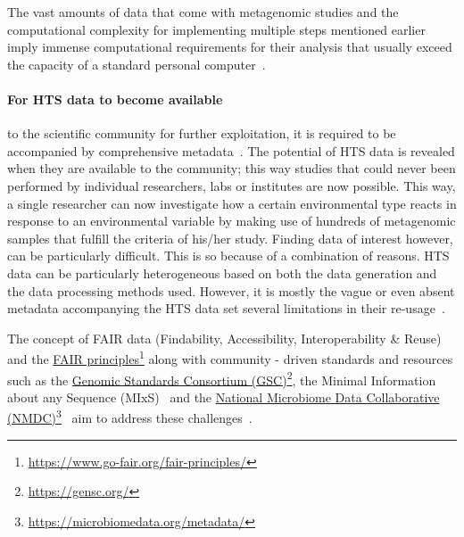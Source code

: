       The vast amounts of data that come with metagenomic studies and the computational complexity for implementing multiple steps mentioned earlier imply immense computational requirements for their analysis that usually exceed the capacity of a standard personal computer~\citep{merelli2014managing}. 

      \paragraph{For HTS data to become available}
      to the scientific community for further exploitation,
      it is required to be accompanied by
      comprehensive metadata~\citep{vangay2021microbiome}. 
      The potential of HTS data is revealed when they are available to the community; 
      this way studies that could never been performed
      by individual researchers, labs or institutes are now possible. 
      This way, 
      a single researcher can now investigate
      how a certain environmental type reacts in response to an environmental 
      variable by making use of hundreds of metagenomic samples 
      that fulfill the criteria of his/her study.
      Finding data of interest however, can be particularly difficult.
      This is so because of a combination of reasons.
      HTS data can be particularly heterogeneous based on both the data generation and the data processing methods used. 
      However, it is mostly the vague or even absent metadata accompanying the HTS data set several limitations in their re-usage~\citep{hu2022challenges}. 

      The concept of FAIR data (Findability, Accessibility, Interoperability \& Reuse)
      and the \href{https://www.go-fair.org/fair-principles/}{FAIR principles}\footnote{\href{https://www.go-fair.org/fair-principles/}{https://www.go-fair.org/fair-principles/}}
      along with community - driven standards and resources such as 
      the \href{https://gensc.org/}{Genomic Standards Consortium (GSC)}\footnote{\href{https://gensc.org/}{https://gensc.org/}},
      the Minimal Information about any Sequence (MIxS)~\citep{yilmaz2011minimum, yilmaz2011genomic}
      and the \href{https://microbiomedata.org/metadata/}{National Microbiome Data Collaborative (NMDC)}\footnote{\href{https://microbiomedata.org/metadata/}{https://microbiomedata.org/metadata/}}~\citep{wood2020national}
      aim to address these challenges~\citep{wilkinson2016fair}.
